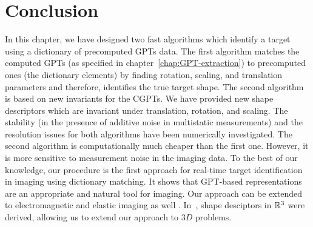 \section{Conclusion}\label{sec:conclusion}
In this chapter, we have designed two fast algorithms which identify
a target using a dictionary of precomputed GPTs data.
The first algorithm matches the computed GPTs (as specified in chapter~\ref{chap:GPT-extraction}) to
precomputed ones (the dictionary elements) by finding rotation,
scaling, and translation parameters and therefore, identifies the
true target shape. The second algorithm  is based on new
invariants for the CGPTs. We have provided new shape descriptors
which are invariant under translation, rotation, and scaling. The
stability (in the presence of additive noise in multistatic
measurements) and the resolution issues for both algorithms have
been numerically investigated. The second algorithm is
computationally much cheaper than the first one. However, it is
more sensitive to measurement noise in the imaging data. To the
best of our knowledge, our procedure is the first approach for
real-time target identification in imaging using dictionary
matching. It shows that GPT-based representations are an
appropriate and natural tool for imaging. Our approach can be
extended to electromagnetic and elastic imaging as well
\cite{mc2,resol}. In~\cite{wang2013-3DSD}, shape desciptors in $\R^3$ were derived,
allowing us to extend our approach to $3D$ problems.


